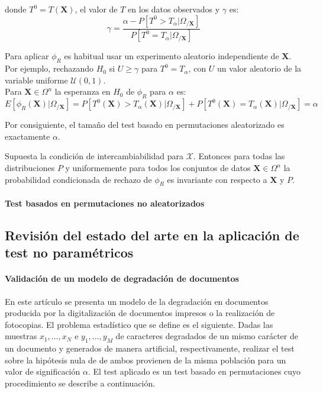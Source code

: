 	donde $T^0 = T(\mathbf{X})$, el valor de $T$ en los datos observados y $\gamma$ es:
	\[
		\gamma = \frac{\alpha - P[T^0 > T_\alpha | 
								\Omega_{/\mathbf{X}}]}
					  {P[T^0 = T_\alpha | 
								\Omega_{/\mathbf{X}}]}
	\]
	
	Para aplicar $\phi_R$ es habitual usar un experimento aleatorio independiente de $\mathbf{X}$. Por ejemplo, rechazando $H_0$ si $U \geq \gamma$ para $T^0 = T_\alpha$, con $U$ un valor aleatorio de la variable uniforme $\mathcal{U}(0,1)$.\\
	Para $\mathbf{X} \in \Omega^n$ la esperanza en $H_0$ de $\phi_R$ para $\alpha$ es:
	\[ E[ \phi_R(\mathbf{X}) | \Omega_{/\mathbf{X}}] =
			P[ T^0(\mathbf{X}) > T_\alpha(\mathbf{X}) | 
								\Omega_{/\mathbf{X}}] + 
			P[ T^0(\mathbf{X}) = T_\alpha(\mathbf{X}) | 
								\Omega_{/\mathbf{X}}] =
			\alpha
	\]
	
	Por consiguiente, el tamaño del test basado en permutaciones aleatorizado es exactamente $\alpha$.
	
\begin{proposicion}
	Supuesta la condición de intercambiabilidad para $\mathcal{X}$. Entonces para todas las distribuciones $P$ y uniformemente para todos los conjuntos de datos $\mathbf{X} \in \Omega^n$ la probabilidad condicionada de rechazo de $\phi_R$ es invariante con respecto a $\mathbf{X}$ y $P$.
\end{proposicion}

\paragraph{Test basados en permutaciones no aleatorizados}

	
	
	
\subsection{Revisión del estado del arte en la aplicación de test no paramétricos}
 
\paragraph{Validación de un modelo de degradación de documentos} \cite{KANUNGO00} En este artículo se presenta un modelo de la degradación en documentos producida por la digitalización de documentos impresos o la realización de fotocopias. El problema estadístico que se define es el siguiente. Dadas las muestras $x_1, \dots, x_N$ e $y_1, \dots, y_M$ de caracteres degradados de un mismo carácter de un documento y generados de manera artificial, respectivamente, realizar el test sobre la hipótesis nula de de ambos  provienen de la misma población para un valor de significación $\alpha$. El test aplicado es un test basado en permutaciones cuyo procedimiento se describe a continuación.

